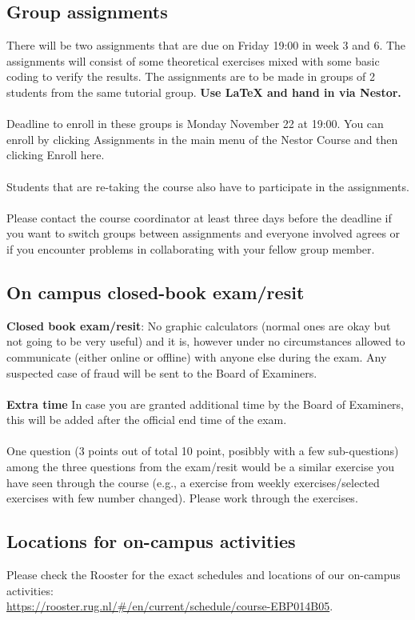 \documentclass[openany]{article}
\begin{document}
\subsection{Group assignments}
There will be two assignments that are due on Friday
19:00 in week 3 and 6. The assignments will consist of some theoretical
exercises mixed with some basic coding to verify the results. The assignments
are to be made in groups of 2 students from the same tutorial group. \textbf{Use LaTeX and hand in via Nestor.} \\~\\
Deadline
to enroll in these groups is Monday November 22 at 19:00. You can
enroll by clicking Assignments in the main menu of the Nestor Course and
then clicking Enroll here.\\~\\
Students that are re-taking the course also have to participate in
the assignments.\\~\\
Please contact the course coordinator at least three days before the deadline if 
you want to switch groups between assignments and everyone involved agrees or
if you encounter problems in collaborating with your fellow group member.  

\subsection{On campus closed-book exam/resit}
\textbf{Closed book exam/resit}: No graphic calculators (normal ones are okay but not going to be very useful) and it is, however under no circumstances allowed to
communicate (either online or offline) with anyone else during the exam.
Any suspected case of fraud will be sent to the Board of Examiners. \\~\\
\textbf{Extra time } In case you are granted additional time by the Board of Examiners, this will be added after the official end time of the exam.\\~\\
One question (3 points out of total 10 point, posibbly with a few sub-questions) among the three questions from the exam/resit would be a similar exercise you have seen through the course (e.g., a exercise from weekly exercises/selected exercises with few number changed). Please work through the exercises. 

\subsection{Locations for on-campus activities}
Please check the Rooster for the exact schedules and locations of our on-campus activities:\\ \href{https://rooster.rug.nl/#/en/current/schedule/course-EBP014B05}{https://rooster.rug.nl/\#/en/current/schedule/course-EBP014B05}.
\end{document}
